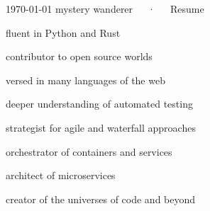 \documentclass[18pt, letterpaper]{awesome-cv}
\begin{document}
\makecvheader[C]

\makecvfooter
  {\today}
  {mystery wanderer~~~·~~~Resume}
  {\thepage}







\begin{cventries}
\begin{cvitems}
    
    \item{fluent in Python and Rust}
    
    \item{contributor to open source worlds}
    
    \item{versed in many languages of the web}
    
    \item{deeper understanding of automated testing}
    
    \item{strategist for agile and waterfall approaches}

\end{cvitems}
\end{cventries}

\begin{cventries}

{
\begin{cvitems}
    \item{orchestrator of containers and services}
    \item{architect of microservices}
    \item{creator of the universes of code and beyond}
\end{cvitems}
}

\end{cventries}
\end{document}
